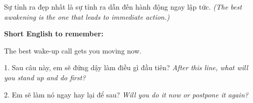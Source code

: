 \begin{baihoc}
Sự tỉnh ra đẹp nhất là sự tỉnh ra dẫn đến hành động ngay lập tức.
\textit{(The best awakening is the one that leads to immediate action.)}
\end{baihoc}

\begin{ghinhoanh}
\textbf{Short English to remember:}

The best wake-up call gets you moving now.

\end{ghinhoanh}

\begin{tuhocnhanh}
1. Sau câu này, em sẽ đứng dậy làm điều gì đầu tiên? \textit{After this line, what will you stand up and do first?}

2. Em sẽ làm nó ngay hay lại để sau? \textit{Will you do it now or postpone it again?}
\end{tuhocnhanh}
\ngancach